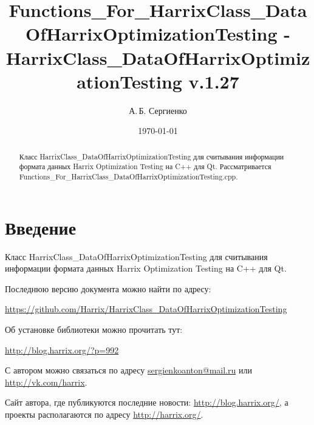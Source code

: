 \documentclass[a4paper,12pt]{article}
\title{Fu\-ncti\-ons\_For\_Har\-rix\-Class\_Da\-ta\-Of\-Har\-rix\-Opt\-im\-iz\-at\-ion\-Tes\-ting - Har\-rix\-Class\_Da\-ta\-Of\-Har\-rix\-Op\-ti\-mi\-za\-tion\-Test\-ing v.1.27}
\author{А.\,Б. Сергиенко}
\date{\today}
\begin{document}


\maketitle

\begin{abstract}
Класс HarrixClass\_DataOfHarrixOptimizationTesting для считывания информации формата данных Harrix Optimization Testing на C++ для Qt. Рассматривается Functions\_For\_HarrixClass\_DataOfHarrixOptimizationTesting.cpp.
\end{abstract}

\tableofcontents

\newpage

\section{Введение}

Класс HarrixClass\_DataOfHarrixOptimizationTesting для считывания информации формата данных Harrix Optimization Testing на C++ для Qt.

Последнюю версию документа можно найти по адресу:

\href{https://github.com/Harrix/HarrixClass\_DataOfHarrixOptimizationTesting}{https://github.com/Harrix/HarrixClass\_DataOfHarrixOptimizationTesting}

Об установке библиотеки можно прочитать тут:

\href{http://blog.harrix.org/?p=992}{http://blog.harrix.org/?p=992}

С автором можно связаться по адресу \href{mailto:sergienkoanton@mail.ru}{sergienkoanton@mail.ru} или  \href{http://vk.com/harrix}{http://vk.com/harrix}.

Сайт автора, где публикуются последние новости: \href{http://blog.harrix.org/}{http://blog.harrix.org/}, а проекты располагаются по адресу \href{http://harrix.org/}{http://harrix.org/}.

\newpage
\end{document}
